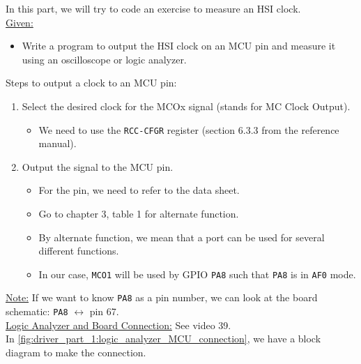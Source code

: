 In this part, we will try to code an exercise to measure an HSI clock.\\

\underline{Given:}

\begin{itemize}
    \item Write a program to output the HSI clock on an MCU pin and measure it using an oscilloscope or logic analyzer.
\end{itemize}

Steps to output a clock to an MCU pin:

\begin{enumerate}
    \item Select the desired clock for the MCOx signal (stands for MC Clock Output). 

    \begin{itemize}
        \item We need to use the \verb|RCC-CFGR| register (section 6.3.3 from the reference manual).
    \end{itemize}

    \item Output the signal to the MCU pin.

    \begin{itemize}
        \item For the pin, we need to refer to the data sheet.

        \item Go to chapter 3, table 1 for alternate function.

        \item By alternate function, we mean that a port can be used for several different functions. 

        \item In our case, \verb|MCO1| will be used by GPIO \verb|PA8| such that \verb|PA8| is in \verb|AF0| mode.

        
    \end{itemize}
    
\end{enumerate}      

\underline{Note:} If we want to know \verb|PA8| as a pin number, we can look at the board schematic: \verb|PA8| $\leftrightarrow$ pin 67.\\ 

\underline{Logic Analyzer and Board Connection:} See video 39.\\

In \autoref{fig:driver_part_1:logic_analyzer_MCU_connection}, we have a block diagram to make the connection.


